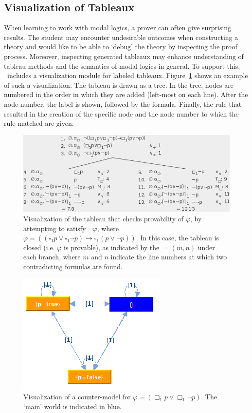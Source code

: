 \subsection{Visualization of Tableaux}

When learning to work with modal logics, a prover can often give surprising
results. The student may encounter undesirable outcomes when constructing a
theory and would like to be able to `debug' the theory by inspecting the proof
process. Moreover, inspecting generated tableaux may enhance understanding of
tableau methods and the semantics of modal logics in general.
To support this, \oops\ includes a visualization module for labeled tableaux.
Figure~\ref{fig:tableauVis} shows an example of such a visualization. 
The tableau is drawn as a tree.
In the tree, nodes are numbered  in the order in which they are added
(left-most on each line).
After the node number, the
label is shown, followed by the formula. Finally, the rule that resulted in
the creation of the specific node and the node number to which the rule
matched are given.

\begin{figure}[p]
\centering
\includegraphics[scale=.50]{images/tableauVis}
\caption{Visualization of the tableau that checks provability of $\varphi$, by
attempting to satisfy $\neg \varphi$, where
$\varphi = ((\square_1 p \vee \square_1 \neg p) \to \square_1(p \vee \neg p))$.
In this case, the tableau is closed (i.e. $\varphi$ is provable), as indicated
by the $= (m, n)$ under each branch, where $m$ and $n$ indicate the line
numbers at which two contradicting formulas are found.}
\label{fig:tableauVis}
\end{figure}

\begin{figure}[p]
\centering
\includegraphics[scale=.50]{images/modelVis}
\caption{Visualization of a counter-model for $\varphi = (\Box_1 p \vee \Box_1
\neg p)$. The `main' world is indicated in blue.}
\label{fig:modelVis}
\end{figure}

